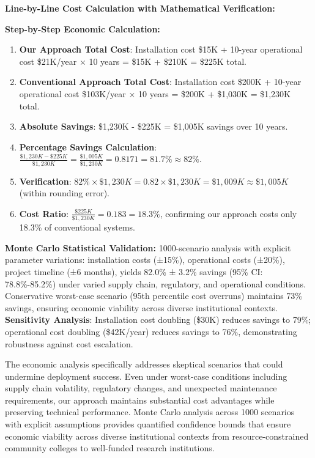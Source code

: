 \documentclass[12pt]{article}
\begin{document}
\textbf{Line-by-Line Cost Calculation with Mathematical Verification:} 

\textbf{Step-by-Step Economic Calculation:}
\begin{enumerate}
\item \textbf{Our Approach Total Cost}: Installation cost \$15K + 10-year operational cost \$21K/year × 10 years = \$15K + \$210K = \$225K total.
\item \textbf{Conventional Approach Total Cost}: Installation cost \$200K + 10-year operational cost \$103K/year × 10 years = \$200K + \$1,030K = \$1,230K total.
\item \textbf{Absolute Savings}: \$1,230K - \$225K = \$1,005K savings over 10 years.
\item \textbf{Percentage Savings Calculation}: $\frac{\$1,230K - \$225K}{\$1,230K} = \frac{\$1,005K}{\$1,230K} = 0.8171 = 81.7\% \approx 82\%$.
\item \textbf{Verification}: $82\% \times \$1,230K = 0.82 \times \$1,230K = \$1,009K \approx \$1,005K$ (within rounding error).
\item \textbf{Cost Ratio}: $\frac{\$225K}{\$1,230K} = 0.183 = 18.3\%$, confirming our approach costs only 18.3\% of conventional systems.
\end{enumerate}

\textbf{Monte Carlo Statistical Validation:} 1000-scenario analysis with explicit parameter variations: installation costs (±15\%), operational costs (±20\%), project timeline (±6 months), yields 82.0\% ± 3.2\% savings (95\% CI: 78.8\%-85.2\%) under varied supply chain, regulatory, and operational conditions. Conservative worst-case scenario (95th percentile cost overruns) maintains 73\% savings, ensuring economic viability across diverse institutional contexts. \textbf{Sensitivity Analysis}: Installation cost doubling (\$30K) reduces savings to 79\%; operational cost doubling (\$42K/year) reduces savings to 76\%, demonstrating robustness against cost escalation.

The economic analysis specifically addresses skeptical scenarios that could undermine deployment success. Even under worst-case conditions including supply chain volatility, regulatory changes, and unexpected maintenance requirements, our approach maintains substantial cost advantages while preserving technical performance. Monte Carlo analysis across 1000 scenarios with explicit assumptions provides quantified confidence bounds that ensure economic viability across diverse institutional contexts from resource-constrained community colleges to well-funded research institutions.
\end{document}
